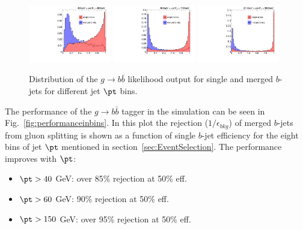 \begin{figure}[tp]
\centering
\includegraphics[width=0.32\textwidth,viewport=35 45 540 550,clip]{FIGS/Likelihood/NNoutput040_LihoodKDE.pdf}
\includegraphics[width=0.32\textwidth,viewport=35 45 540 550,clip]{FIGS/Likelihood/NNoutput080_LihoodKDE.pdf}
\includegraphics[width=0.32\textwidth,viewport=35 45 540 550,clip]{FIGS/Likelihood/NNoutput270_LihoodKDE.pdf}  
\caption{Distribution of the $g\rightarrow b \bar{b}$ likelihood output for single and merged $b$-jets for different jet $\pt$ bins.}
\label{fig:outputinbins}
\end{figure}

The performance of the $g\rightarrow b \bar{b}$ tagger in the simulation can be seen in Fig.~\ref{fig:performanceinbins}. In this plot the rejection ($1/\epsilon_{bkg}$) of merged $b$-jets from gluon splitting is shown as a function of single $b$-jet efficiency for the eight bins of jet $\pt$ mentioned in section~\ref{sec:EventSelection}. The performance improves with $\pt$:


\begin{itemize}\addtolength{\itemsep}{-0.4\baselineskip}
\item
$\pt>40$ GeV: %
 over 85\% rejection at 50\% eff.
\item
$\pt>60$ GeV: %
 90\% rejection at 50\% eff.
\item
$\pt>150$ GeV: %
 over 95\% rejection at 50\% eff.
\end{itemize}


